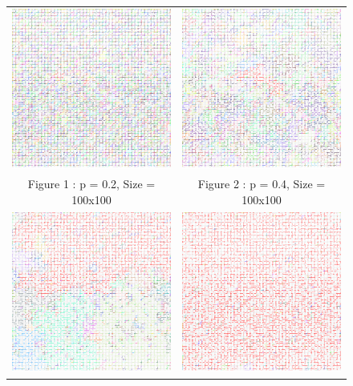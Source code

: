 \documentclass{article}
\begin{document}
\begin{figure}
\begin{tabular}{cc}
  \includegraphics[width=55mm]{perc_20_2} &   \includegraphics[width=55mm]{perc_40_2} \\
Figure 1 : p = 0.2, Size = 100x100 & Figure 2 : p = 0.4, Size = 100x100 \\[6pt]
 \includegraphics[width=
 55mm]{perc_50_2} &   \includegraphics[width=55mm]{perc_60_2} \\

\end{tabular}
\end{figure}
\end{document}
